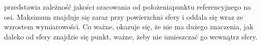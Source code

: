  przedstawia zależność jakości szacowania od położenia\linebreak punktu referencyjnego na osi. Maksimum znajduje się zaraz przy powierzchni sfery i oddala się wraz ze wzrostem wymiarowości. Co ważne, okazuje się, że nie ma dużego znaczenia, jak daleko od sfery znajdzie się punkt, ważne, żeby nie umieszczać go wewnątrz sfery.


